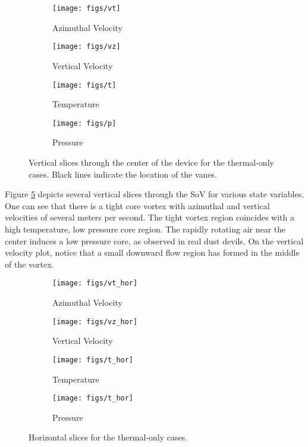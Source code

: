\begin{figure}[htb]

 \begin{subfigure}{.5\textwidth}
  \centering
  \texttt{[image: figs/vt]}
  \caption{Azimuthal Velocity}
  \label{fig:vt-to}
 \end{subfigure}%
 \begin{subfigure}{.5\textwidth}
  \centering
  \texttt{[image: figs/vz]}
  \caption{Vertical Velocity}
  \label{fig:vz-to}
 \end{subfigure}%


 \begin{subfigure}{.5\textwidth}
  \centering
  \texttt{[image: figs/t]}
  \caption{Temperature}
  \label{fig:t-to}
 \end{subfigure}%
 \begin{subfigure}{.5\textwidth}
  \centering
  \texttt{[image: figs/p]}
  \caption{Pressure}
  \label{fig:p-to}
 \end{subfigure}%

 \caption{Vertical slices through the center of the device for the thermal-only cases. Black lines 
   indicate the location of the vanes.}
 \label{fig:to-vert}
\end{figure}

%
%
%
Figure \ref{fig:to-vert} depicts several vertical slices through the SoV
for various state variables. One can see that there is a tight core
vortex with azimuthal and vertical velocities of several meters per
second. The tight vortex region coincides with a high temperature, low
pressure core region. The rapidly rotating air near the center induces
a low pressure core, as observed in real dust devils.
On the vertical velocity plot, notice that a small
downward flow region has formed in the middle of the vortex. 

\begin{figure}[htb]

 \begin{subfigure}{.5\textwidth}
  \centering
  \texttt{[image: figs/vt\_hor]}
  \caption{Azimuthal Velocity}
  \label{fig:vt-to}
 \end{subfigure}%
 \begin{subfigure}{.5\textwidth}
  \centering
  \texttt{[image: figs/vz\_hor]}
  \caption{Vertical Velocity}
  \label{fig:vz-to}
 \end{subfigure}%


 \begin{subfigure}{.5\textwidth}
  \centering
  \texttt{[image: figs/t\_hor]}
  \caption{Temperature}
  \label{fig:t-to}
 \end{subfigure}%
 \begin{subfigure}{.5\textwidth}
  \centering
  \texttt{[image: figs/t\_hor]}
  \caption{Pressure}
  \label{fig:p-to}
 \end{subfigure}%

 \caption{Horizontal slices for the thermal-only cases.}
 \label{fig:to-hor}
\end{figure}

